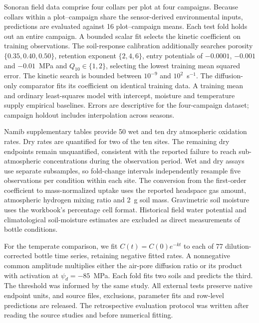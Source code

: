 \documentclass[11pt,a4paper]{article}
\begin{document}
Sonoran field data comprise four collars per plot at four campaigns. Because collars within a plot--campaign share the sensor-derived environmental inputs, predictions are evaluated against 16 plot--campaign means. Each test fold holds out an entire campaign. A bounded scalar fit selects the kinetic coefficient on training observations. The soil-response calibration additionally searches porosity $\{0.35,0.40,0.50\}$, retention exponent $\{2,4,6\}$, entry potentials of $-0.0001$, $-0.001$ and $-0.01$~MPa and $Q_{10}\in\{1,2\}$, selecting the lowest training mean squared error. The kinetic search is bounded between $10^{-9}$ and $10^2$~s$^{-1}$. The diffusion-only comparator fits its coefficient on identical training data. A training mean and ordinary least-squares model with intercept, moisture and temperature supply empirical baselines. Errors are descriptive for the four-campaign dataset; campaign holdout includes interpolation across seasons.

Namib supplementary tables provide 50 wet and ten dry atmospheric oxidation rates. Dry rates are quantified for two of the ten sites. The remaining dry endpoints remain unquantified, consistent with the reported failure to reach sub-atmospheric concentrations during the observation period. Wet and dry assays use separate subsamples, so fold-change intervals independently resample five observations per condition within each site. The conversion from the first-order coefficient to mass-normalized uptake uses the reported headspace gas amount, atmospheric hydrogen mixing ratio and 2~g soil mass. Gravimetric soil moisture uses the workbook's percentage cell format. Historical field water potential and climatological soil-moisture estimates are excluded as direct measurements of bottle conditions.

For the temperate comparison, we fit $C(t)=C(0)e^{-kt}$ to each of 77 dilution-corrected bottle time series, retaining negative fitted rates. A nonnegative common amplitude multiplies either the air-pore diffusion ratio or its product with activation at $\psi_d=-85$~MPa. Each fold fits two soils and predicts the third. The threshold was informed by the same study. All external tests preserve native endpoint units, and source files, exclusions, parameter fits and row-level predictions are released. The retrospective evaluation protocol was written after reading the source studies and before numerical fitting.
\end{document}
